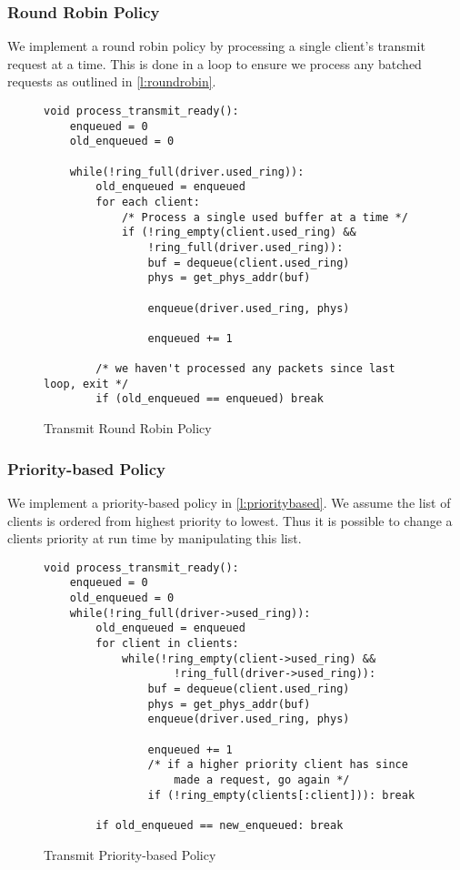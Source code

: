 \subsubsection{Round Robin Policy}
We implement a round robin policy by processing a single client's transmit request at a time.
This is done in a loop to ensure we process any batched requests as outlined in \autoref{l:roundrobin}.

\begin{figure} [H]
    \begin{verbatim}
void process_transmit_ready():
    enqueued = 0
    old_enqueued = 0

    while(!ring_full(driver.used_ring)):
        old_enqueued = enqueued
        for each client:
            /* Process a single used buffer at a time */
            if (!ring_empty(client.used_ring) &&
                !ring_full(driver.used_ring)):
                buf = dequeue(client.used_ring)
                phys = get_phys_addr(buf)

                enqueue(driver.used_ring, phys)

                enqueued += 1
            
        /* we haven't processed any packets since last loop, exit */
        if (old_enqueued == enqueued) break
\end{verbatim}
\caption{Transmit Round Robin Policy}
\label{l:roundrobin}
\end{figure}

\subsubsection{Priority-based Policy}

We implement a priority-based policy in \autoref{l:prioritybased}. We assume the list of
clients is ordered from highest priority to lowest. Thus it is possible to change a clients
priority at run time by manipulating this list.\\

\begin{figure} [H]
    \begin{verbatim}
void process_transmit_ready():
    enqueued = 0
    old_enqueued = 0
    while(!ring_full(driver->used_ring)):
        old_enqueued = enqueued
        for client in clients:
            while(!ring_empty(client->used_ring) &&
                    !ring_full(driver->used_ring)):
                buf = dequeue(client.used_ring)
                phys = get_phys_addr(buf)
                enqueue(driver.used_ring, phys)

                enqueued += 1
                /* if a higher priority client has since 
                    made a request, go again */
                if (!ring_empty(clients[:client])): break

        if old_enqueued == new_enqueued: break
\end{verbatim}
\caption{Transmit Priority-based Policy}
\label{l:prioritybased}
\end{figure}


